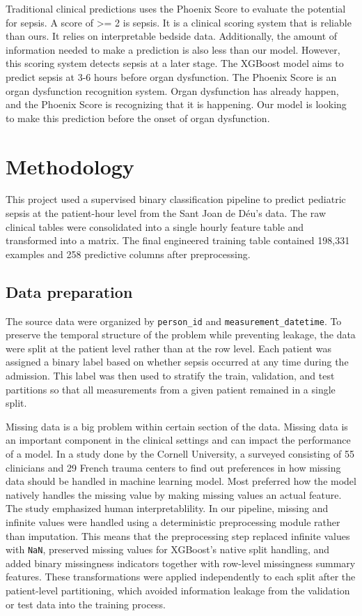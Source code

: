 \documentclass{article}
\begin{document}
Traditional clinical predictions uses the Phoenix Score to evaluate the potential for sepsis.
A score of >= 2 is sepsis. It is a clinical scoring system that is reliable than ours.
It relies on interpretable bedside data. Additionally, the amount of information needed to make a prediction is also
less than our model. However, this scoring system detects sepsis at a later stage. The XGBoost model
aims to predict sepsis at 3-6 hours before organ dysfunction. The Phoenix Score is an organ
dysfunction recognition system. Organ dysfunction has already happen, and the Phoenix Score
is recognizing that it is happening. Our model is looking to make this prediction before the onset of 
organ dysfunction. 

\section{Methodology}
This project used a supervised binary classification pipeline to predict pediatric 
sepsis at the patient-hour level from the Sant Joan de Déu's data. The raw clinical tables 
were consolidated into a single hourly feature table and transformed into a  
matrix. The final engineered training table contained 198{,}331 examples and 
258 predictive columns after preprocessing.

\newpage

\subsection{Data preparation}
The source data were organized by \texttt{person\_id} and \texttt{measurement\_datetime}. 
To preserve the temporal structure of the problem while preventing leakage, 
the data were split at the patient level rather than at the row level. Each patient was 
assigned a binary label based on whether sepsis occurred at any time during the admission. 
This label was then used to stratify the train, validation, and test partitions so 
that all measurements from a given patient remained in a single split.

Missing data is a big problem within certain section of the data. Missing data is an important 
component in the clinical settings and can impact the performance of a model.
In a study done by the Cornell University, a surveyed consisting of 55 clinicians and 29 French
trauma centers to find out preferences in how missing data should be handled in machine learning model.
Most preferred how the model natively handles the missing value by making missing values
an actual feature. The study emphasized human interpretablility.
In our pipeline, missing and infinite values were handled using a deterministic preprocessing module 
rather than imputation. This means that the preprocessing step replaced infinite values with \texttt{NaN}, 
preserved missing values for XGBoost's native split handling, and added binary missingness 
indicators together with row-level missingness summary features. These transformations were 
applied independently to each split after the patient-level partitioning, which avoided information 
leakage from the validation or test data into the training process.
\end{document}
